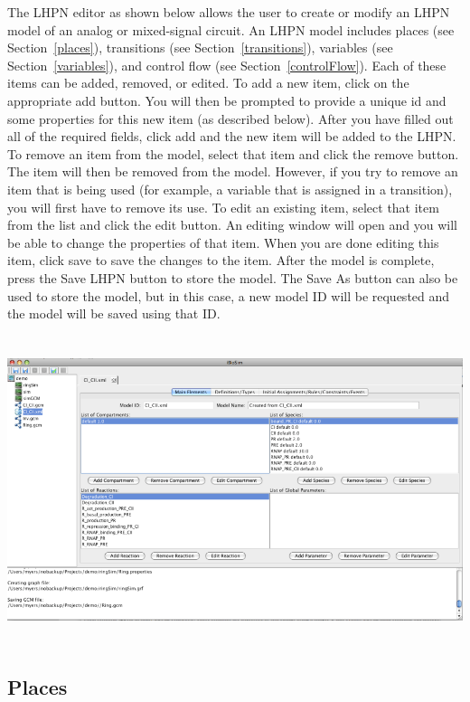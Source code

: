 \documentclass[titlepage,11pt]{article}
\begin{document}
\noindent
The LHPN editor as shown below allows the user to create or modify an LHPN
model of an analog or mixed-signal circuit.  An LHPN model includes
places (see Section~\ref{places}),
transitions (see Section~\ref{transitions}), 
variables (see Section~\ref{variables}), and
control flow (see Section~\ref{controlFlow}).
Each of these items can be added, removed, or edited. 
To add a new item, click on the appropriate add button. You
will then be prompted to provide a unique id and some properties
for this new item (as described below). After you have filled out
all of the required fields, click add and the new item will be
added to the LHPN.
To remove an item from the model, select that item and click
the remove button. The item will then be removed from the model.
However, if you try to remove an item that is being used 
(for example, a variable that is assigned in a transition), you will first have 
to remove its use.
To edit an existing item, select that item from the list and
click the edit button. An editing window will open and you will
be able to change the properties of that item. When you are done
editing this item, click save to save the changes to the item. 
After the model is complete, press the Save LHPN button to store
the model. The Save As button can also be used to store the
model, but in this case, a new model ID will be requested and the
model will be saved using that ID. 
\begin{center}
\includegraphics[height=90mm]{screenshots/SBMLedit}
\end{center}

\subsection{\label{places}Places}
\end{document}
